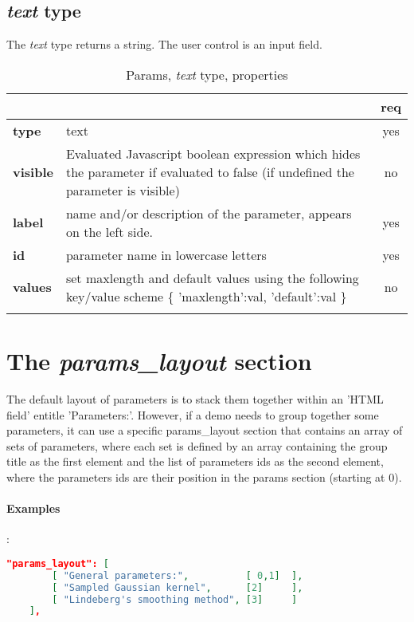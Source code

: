 \subsection{ \emph{text} type}

The \emph{text} type returns a string. The user control is an input field.

\begin{longtable}{|>{\bf}L{\linewidth}|L{\linewidth}|c|}
\hline
      &  & {\bf req} 
\tabularnewline \hline \hline
 type       & text   & yes \\ \hline
 visible    & Evaluated Javascript boolean expression which hides the parameter
              if evaluated to false (if undefined the parameter is visible) & no \\ \hline
 label      & name and/or description of the parameter, appears on the left side. & yes \\ \hline
 id         & parameter name in lowercase letters & yes \\ \hline
 values     & set maxlength and default values using the following key/value scheme \{ 'maxlength':val, 'default':val \} & no \\ \hline
\caption{Params, \emph{text} type, properties}
\end{longtable}

\section{The \emph{params\_layout} section}

The default layout of parameters is to stack them together within an 'HTML field'
entitle 'Parameters:'. However, if a demo needs to group together some parameters,
it can use a specific params\_layout section that contains an array of
sets of parameters, where each set is defined by an array containing the group 
title as the first element and the list of parameters ids as the second element,
where the parameters ids are their position in the params section (starting at 0).

\paragraph{Examples}:\\
\begin{lstlisting}[language=json,firstnumber=1]
  "params_layout": [
        [ "General parameters:",          [ 0,1]  ],
        [ "Sampled Gaussian kernel",      [2]     ],
        [ "Lindeberg's smoothing method", [3]     ]
    ],
\end{lstlisting}

